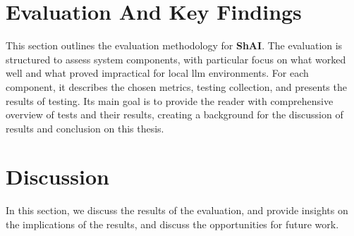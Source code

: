 
\clearpage

\section{Evaluation And Key Findings}

This section outlines the evaluation methodology for \textbf{ShAI}. The
evaluation is structured to assess system components, with particular focus on
what worked well and what proved impractical for local \gls{llm} environments.
For each component, it describes the chosen metrics, testing collection, and
presents the results of testing.
Its main goal is to provide the reader with comprehensive overview of tests and
their results, creating a background for the discussion of results and
conclusion on this thesis.




\clearpage

\section{Discussion}
In this section, we discuss the results of the evaluation, and provide insights
on the implications of the results, and discuss the opportunities for future
work.


